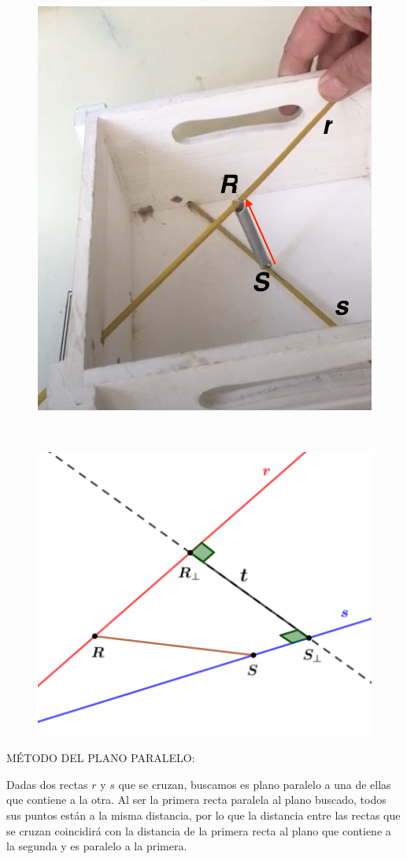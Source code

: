 $\quad$ %

\begin{multicols}{2}
	\begin{figure}[H]
		\centering
		\includegraphics[width=.4\textwidth]{imagenes/imagenes11/T11IM20.png}
	\end{figure}
	
	$\quad$
	\begin{figure}[H]
		\centering
		\includegraphics[width=.4\textwidth]{imagenes/imagenes11/T11IM19.png}
	\end{figure}
\end{multicols}

\noindent MÉTODO DEL PLANO PARALELO:

\noindent Dadas dos rectas $r$ y $s$ que se cruzan, buscamos es plano paralelo a una de ellas que contiene a la otra. Al ser la primera recta paralela al plano buscado, todos sus puntos están a la misma distancia, por lo que la distancia entre las rectas que se cruzan coincidirá con la distancia de la primera recta al plano que contiene a la segunda y es paralelo a la primera.

